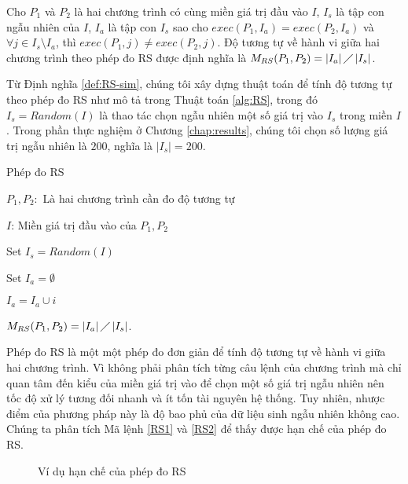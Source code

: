 \begin{definition}[Phép đo RS]
  \label{def:RS-sim}
  Cho $P_{1}$ và $P_{2}$ là hai chương trình có cùng miền giá trị đầu
  vào $I$, $I_{s}$ là tập con ngẫu nhiên của $I$, $I_{a}$ là tập con
  $I_{s}$ sao cho $exec(P_{1}, I_a) = exec(P_{2}, I_a)$ và
  $\forall j \in I_{s} \setminus I_{a}$, thì
  $exec(P_{1}, j) \neq exec(P_{2}, j)$. Độ tương tự về hành vi giữa
  hai chương trình theo phép đo RS được định nghĩa là
  $M_{RS}(P_{1}, P_{2}) = \left|I_{a}\right| \diagup
  \left|I_{s}\right| $.
\end{definition}

Từ Định nghĩa \ref{def:RS-sim}, chúng tôi xây dựng thuật toán để tính
độ tương tự theo phép đo RS như mô tả trong Thuật toán \ref{alg:RS},
trong đó $I_s = Random(I)$ là thao tác chọn ngẫu nhiên một số giá trị
vào $I_s$ trong miền $I$. Trong phần thực nghiệm ở Chương
\ref{chap:results}, chúng tôi chọn số lượng giá trị ngẫu nhiên là
$200$, nghĩa là $|I_s| = 200$.

\begin{algorithm}[H]
  \caption{Phép đo RS}
  \label{alg:RS}
  \begin{algorithmic}
  \item $P_{1}, P_{2}:$ Là hai chương trình cần đo độ tương tự
  \item $I$: Miền giá trị đầu vào của $P_{1}, P_{2}$
  \item Set $I_{s} = Random(I)$ 
  \item Set $I_{a} = \emptyset$

         \State
        $I_{a} = I_{a} \cup i$
    \EndIf
    \EndFor
  \item
    $M_{RS}(P_{1}, P_{2}) = \left|I_{a}\right| \diagup
    \left|I_{s}\right| $.
  \end{algorithmic}
\end{algorithm}


Phép đo RS là một một phép đo đơn giản để tính độ tương tự về hành vi 
giữa hai chương trình. Vì không phải phân tích từng câu lệnh của 
chương trình mà chỉ quan tâm đến kiểu của miền giá trị vào để 
chọn một số giá trị ngẫu nhiên nên tốc độ xử lý tương đối nhanh 
và ít tốn tài nguyên hệ thống. Tuy nhiên, nhược điểm của phương 
pháp này là độ bao phủ của dữ liệu sinh ngẫu nhiên không cao. 
Chúng ta phân tích Mã lệnh \ref{RS1} và \ref{RS2} để thấy được 
hạn chế của phép đo RS.

\begin{figure}[h]
	\centering
	\caption{Ví dụ hạn chế của phép đo RS}
	\label{fig:Hanche-RS}
	\begin{minipage}[t]{0.45\linewidth}
		
	\end{minipage}%
	\hfill\vrule\hfill
	\begin{minipage}[t]{0.45\linewidth}
		
	\end{minipage}%
\end{figure}

